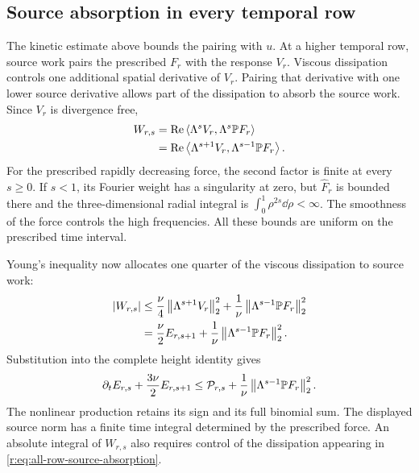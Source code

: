 \subsection{Source absorption in every temporal row}
\label{r:sec:all-row-source-absorption}

The kinetic estimate above bounds the pairing with \(u\). At a higher
temporal row, source work pairs the prescribed \(F_r\) with the response
\(V_r\). Viscous dissipation controls one additional spatial derivative
of \(V_r\). Pairing that derivative with one lower source derivative
allows part of the dissipation to absorb the source work.
Since \(V_r\) is divergence free,
\begin{equation}
 \begin{aligned}
 W_{r,s}
 &=\operatorname{Re}\left\langle \Lambda^sV_r,\Lambda^s\mathbb P F_r\right\rangle\\
 &=\operatorname{Re}\left\langle \Lambda^{s+1}V_r,\Lambda^{s-1}\mathbb P F_r\right\rangle.
 \end{aligned}
 \label{r:eq:all-row-source-duality}
\end{equation}
For the prescribed rapidly decreasing force, the second factor is finite
at every \(s\ge0\). If \(s<1\), its Fourier weight has a singularity
at zero, but \(\widehat F_r\) is bounded there and the three-dimensional
radial integral is \(\int_0^1\rho^{2s}\dd\rho<\infty\).
The smoothness of the force controls the high frequencies. All these
bounds are uniform on the prescribed time interval.

Young's inequality now allocates one quarter of the viscous dissipation
to source work:
\begin{equation}
 \begin{aligned}
 |W_{r,s}|
 &\le\frac\nu4\left\lVert \Lambda^{s+1}V_r\right\rVert_2^2
       +\frac1\nu\left\lVert \Lambda^{s-1}\mathbb P F_r\right\rVert_2^2\\
 &=\frac\nu2E_{r,s+1}
       +\frac1\nu\left\lVert \Lambda^{s-1}\mathbb P F_r\right\rVert_2^2.
 \end{aligned}
 \label{r:eq:all-row-source-absorption}
\end{equation}
Substitution into the complete height identity gives
\begin{equation}
 \partial_tE_{r,s}+\frac{3\nu}{2}E_{r,s+1}
 \le\mathcal P_{r,s}
       +\frac1\nu\left\lVert \Lambda^{s-1}\mathbb P F_r\right\rVert_2^2.
 \label{r:eq:all-row-source-retained-production}
\end{equation}
The nonlinear production retains its sign and its full binomial sum.
The displayed source norm has a finite time integral determined by the
prescribed force. An absolute integral of \(W_{r,s}\) also requires
control of the dissipation appearing in
\eqref{r:eq:all-row-source-absorption}.

